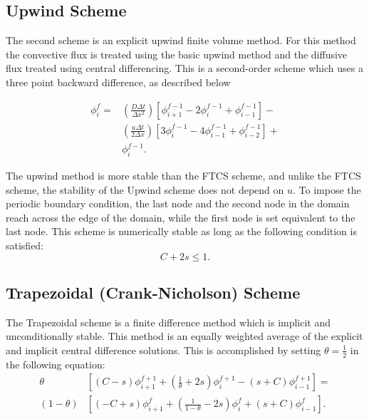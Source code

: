 \documentclass[twocolumn,10pt]{asme2ej}
\begin{document}
\subsection{Upwind Scheme}
The second scheme is an explicit upwind finite volume method. For this method the convective flux is treated using the basic upwind method and the diffusive flux treated using central differencing. This is a second-order scheme which uses a three point backward difference, as described below

\begin{equation}
\label{upwind_eqn}
\begin{split}
\phi_i ^f = & \left( \frac{D \Delta t}{\Delta x^2} \right) \left[ \phi_{i+1} ^{f-1} - 2 \phi_{i} ^{f-1} + \phi_{i-1} ^{f-1} \right] - \\
            & \left( \frac{u \Delta t}{2 \Delta x} \right) \left[ 3 \phi_{i} ^{f-1} - 4 \phi_{i-1} ^{f-1} + \phi_{i-2} ^{f-1} \right] + \\
            & \phi_i ^{f-1}.
\end{split}
\end{equation}

\noindent The upwind method is more stable than the FTCS scheme, and unlike the FTCS scheme, the stability of the Upwind scheme does not depend on $u$. To impose the periodic boundary condition, the last node and the second node in the domain reach across the edge of the domain, while the first node is set equivalent to the last node. This scheme is numerically stable as long as the following condition is satisfied:
\begin{equation}
\label{Upwind_stability}
C + 2s \leq 1.
\end{equation}

\subsection{Trapezoidal (Crank-Nicholson) Scheme}
The Trapezoidal scheme is a finite difference method which is implicit and unconditionally stable. This method is an equally weighted average of the explicit and implicit central difference solutions. This is accomplished by setting $\theta = \frac{1}{2}$ in the following equation:
\begin{equation*}
\begin{split}
\theta & \left[\left(C-s\right)\phi^{f+1}_{i+1} + \left(\frac{1}{\theta}+2s\right)\phi^{f+1}_{i} - \left(s+C\right)\phi^{f+1}_{i-1}\right] = \\
(1-\theta) & \left[\left(-C+s\right)\phi^{f}_{i+1} + \left(\frac{1}{1-\theta}-2s\right)\phi^{f}_{i} + \left(s+C\right)\phi^{f}_{i-1}\right].
\end{split}
\end{equation*}
\end{document}
